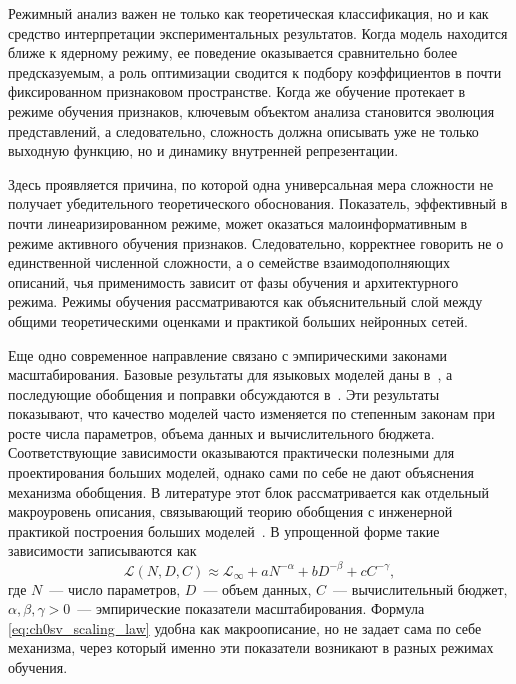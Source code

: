Режимный анализ важен не только как теоретическая классификация, но и как средство интерпретации экспериментальных результатов.
Когда модель находится ближе к ядерному режиму, ее поведение оказывается сравнительно более предсказуемым, а роль оптимизации сводится к подбору коэффициентов в почти фиксированном признаковом пространстве.
Когда же обучение протекает в режиме обучения признаков, ключевым объектом анализа становится эволюция представлений, а следовательно, сложность должна описывать уже не только выходную функцию, но и динамику внутренней репрезентации.

Здесь проявляется причина, по которой одна универсальная мера сложности не получает убедительного теоретического обоснования.
Показатель, эффективный в почти линеаризированном режиме, может оказаться малоинформативным в режиме активного обучения признаков.
Следовательно, корректнее говорить не о единственной численной сложности, а о семействе взаимодополняющих описаний, чья применимость зависит от фазы обучения и архитектурного режима.
Режимы обучения рассматриваются как объяснительный слой между общими теоретическими оценками и практикой больших нейронных сетей.

Еще одно современное направление связано с эмпирическими законами масштабирования. Базовые результаты для языковых моделей даны в~\cite{kaplan2020ScalingLaws,hoffmann2022Chinchila}, а последующие обобщения и поправки обсуждаются в~\cite{meta2024survey,beyondChinchillaInference2023}.
Эти результаты показывают, что качество моделей часто изменяется по степенным законам при росте числа параметров, объема данных и вычислительного бюджета.
Соответствующие зависимости оказываются практически полезными для проектирования больших моделей, однако сами по себе не дают объяснения механизма обобщения.
В литературе этот блок рассматривается как отдельный макроуровень описания, связывающий теорию обобщения с инженерной практикой построения больших моделей~\cite{hu2021complexitysurvey,recent2020theory,belkin2021overview}.
В упрощенной форме такие зависимости записываются как
\begin{equation}
\mathcal L(N,D,C)\approx
\mathcal L_{\infty}+aN^{-\alpha}+bD^{-\beta}+cC^{-\gamma},
\label{eq:ch0sv_scaling_law}
\end{equation}
где $N$~--- число параметров, $D$~--- объем данных, $C$~--- вычислительный бюджет, $\alpha,\beta,\gamma>0$~--- эмпирические показатели масштабирования. Формула \eqref{eq:ch0sv_scaling_law} удобна как макроописание, но не задает сама по себе механизма, через который именно эти показатели возникают в разных режимах обучения.

